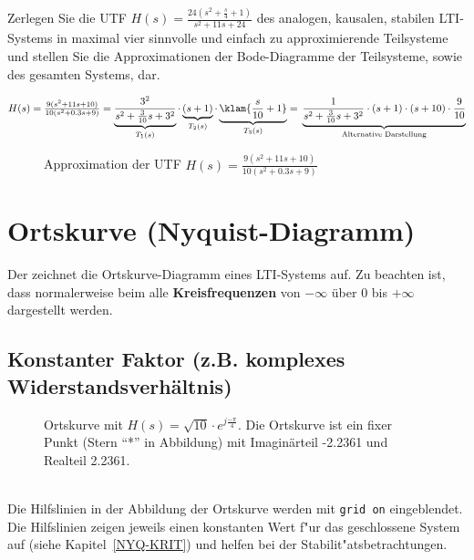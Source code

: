 {\aufg 
Zerlegen Sie die UTF $H(s)=\frac{24(s^2+\frac{s}{4}+1)}{s^2+11s+24}$ des analogen, kausalen, stabilen LTI-Systems in maximal vier sinnvolle und einfach zu approximierende Teilsysteme und stellen Sie die Approximationen der Bode-Diagramme der Teilsysteme, sowie des gesamten Systems, dar. 

$H(s)=\frac{9(s^2+11s+10)}{10(s^2+0.3s+9)}=\underbrace{ \frac{3^2}{s^2+\frac{3}{10}s+3^2}}_{T_1(s)} \cdot \underbrace{ (s+1)}_{T_2(s)}\cdot \underbrace{ \klam{\frac{s}{10}+1}}_{T_3(s)}= \\ \underbrace{ \frac{1}{s^2+\frac{3}{10}s+3^2}\cdot (s+1)\cdot (s+10)\cdot \frac{9}{10}}_{\text{Alternative Darstellung}}$\\
\begin{figure}[!htb]
\begin{center}
 \vspace*{-0.5cm}\caption{Approximation der UTF $H(s)=\frac{9(s^2+11s+10)}{10(s^2+0.3s+9)}$}
\end{center}
\vspace*{-6mm}
\end{figure}

\clearpage
\newpage
\section{Ortskurve (Nyquist-Diagramm)}
Der  zeichnet die Ortskurve-Diagramm eines
LTI-Systems auf. Zu beachten ist, dass normalerweise beim  alle {\bf
  Kreisfrequenzen} von $-\infty$ \"uber 0 bis
$+\infty$ dargestellt werden.

\subsection{Konstanter Faktor (z.B. komplexes Widerstandsverh\"altnis)}
\begin{figure}[!htb] %
\vspace*{-2mm}
\begin{center}
  \vspace*{-3mm}\caption{Ortskurve  mit $H(s)=\sqrt{10}\cdot e^{j\frac{-\pi}{4}}$. Die Ortskurve ist ein fixer Punkt (Stern ``*'' in Abbildung) mit Imagin\"arteil -2.2361 und Realteil 2.2361.}
\end{center}
\vspace*{-6mm}
\end{figure}~\\
Die Hilfslinien in der Abbildung der Ortskurve werden mit {\tt grid on} eingeblendet. Die Hilfslinien zeigen jeweils einen konstanten Wert f"ur das geschlossene System auf (siehe Kapitel~\ref{NYQ-KRIT}) und helfen bei der Stabilit"atsbetrachtungen.

}
